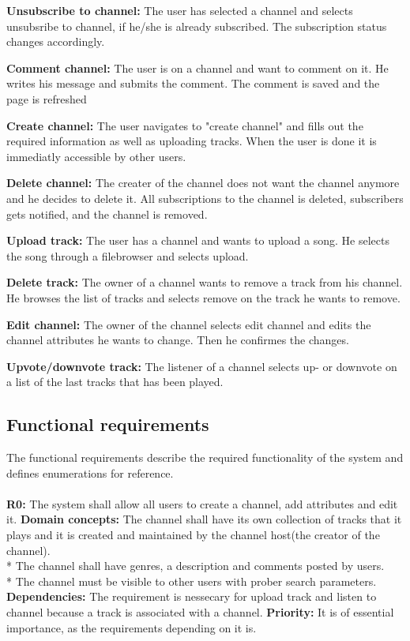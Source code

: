 \documentclass[a4paper,11pt,report]{article}
\begin{document}
\textbf{Unsubscribe to channel:}
The user has selected a channel and selects unsubsribe to channel, if he/she is already subscribed. The subscription status changes accordingly.

\textbf{Comment channel:}
The user is on a channel and want to comment on it. He writes his message and submits the comment. The comment is saved and the page is refreshed

\textbf{Create channel:}
The user navigates to "create channel" and fills out the required information as well as uploading tracks. When the user is done it is immediatly accessible by other users.

\textbf{Delete channel:}
The creater of the channel does not want the channel anymore and he decides to delete it. All subscriptions to the channel is deleted, subscribers gets notified, and the channel is removed.

\textbf{Upload track:}
The user has a channel and wants to upload a song. He selects the song through a filebrowser and selects upload.

\textbf{Delete track:}
The owner of a channel wants to remove a track from his channel. He browses the list of tracks and selects remove on the track he wants to remove.

\textbf{Edit channel:}
The owner of the channel selects edit channel and edits the channel attributes he wants to change. Then he confirmes the changes.

\textbf{Upvote/downvote track:}
The listener of a channel selects up- or downvote on a list of the last tracks that has been played.

\subsection{Functional requirements}
The functional requirements describe the required functionality of the system and defines enumerations for reference.
\\ \\
\textbf{R0:}
The system shall allow all users to create a channel, add attributes and edit it.
\textbf{Domain concepts:}
The channel shall have its own collection of tracks that it plays and it is created and maintained by the channel host(the creator of the channel).\\*
The channel shall have genres, a description and comments posted by users.\\*
The channel must be visible to other users with prober search parameters.
\textbf{Dependencies:}
The requirement is nessecary for upload track and listen to channel because a track is associated with a channel.
\textbf{Priority:}
It is of essential importance, as the requirements depending on it is.
\\ \\
\end{document}
